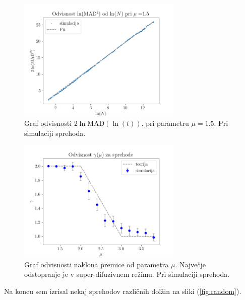 \documentclass[12pt]{article}
\begin{document}
\begin{figure}
    \centering
    \includegraphics[width=0.7\textwidth]{Walk1_5.png}
    \caption{\label{fig:walk} Graf odvisnosti $2\ln{\mathrm{MAD}}(\ln(t))$, pri parametru $\mu = 1.5$. Pri simulaciji sprehoda.}
\end{figure}

\begin{figure}
    \centering
    \includegraphics[width=0.7\textwidth]{SprehodGammaMu.png}
    \caption{\label{fig:sprehod} Graf odvisnosti naklona premice od parametra $\mu$. Največje odstopranje je v super-difuzivnem režimu. Pri simulaciji sprehoda.}
\end{figure}

Na koncu sem izrisal nekaj sprehodov različnih dolžin na sliki (\ref{fig:random}).
\end{document}
